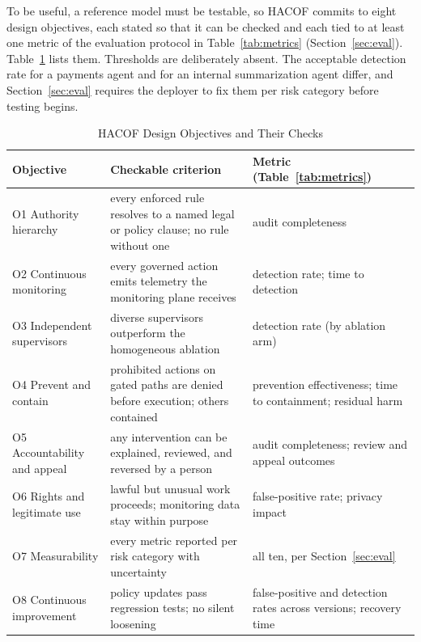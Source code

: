 \documentclass{ieeeaccess}
\newcommand{\hacof}{HACOF}
\begin{document}
To be useful, a reference model must be testable, so \hacof{} commits to eight design objectives, each stated so that it can be checked and each tied to at least one metric of the evaluation protocol in Table~\ref{tab:metrics} (Section~\ref{sec:eval}). Table~\ref{tab:objectives} lists them. Thresholds are deliberately absent. The acceptable detection rate for a payments agent and for an internal summarization agent differ, and Section~\ref{sec:eval} requires the deployer to fix them per risk category before testing begins.

\begin{table}[!t]
\caption{\hacof{} Design Objectives and Their Checks}
\label{tab:objectives}
\centering
\footnotesize
\setlength{\tabcolsep}{3pt}
\begin{tabular}{>{\raggedright\arraybackslash}p{1.75cm}>{\raggedright\arraybackslash}p{3.15cm}>{\raggedright\arraybackslash}p{2.25cm}}
\toprule
\rowcolor{darkblue!15}
\textbf{Objective} & \textbf{Checkable criterion} & \textbf{Metric (Table~\ref{tab:metrics})} \\
\midrule
O1 Authority hierarchy & every enforced rule resolves to a named legal or policy clause; no rule without one & audit completeness \\
\rowcolor{darkblue!5}
O2 Continuous monitoring & every governed action emits telemetry the monitoring plane receives & detection rate; time to detection \\
O3 Independent supervisors & diverse supervisors outperform the homogeneous ablation & detection rate (by ablation arm) \\
\rowcolor{darkblue!5}
O4 Prevent and contain & prohibited actions on gated paths are denied before execution; others contained & prevention effectiveness; time to containment; residual harm \\
O5 Accountability and appeal & any intervention can be explained, reviewed, and reversed by a person & audit completeness; review and appeal outcomes \\
\rowcolor{darkblue!5}
O6 Rights and legitimate use & lawful but unusual work proceeds; monitoring data stay within purpose & false-positive rate; privacy impact \\
O7 Measurability & every metric reported per risk category with uncertainty & all ten, per Section~\ref{sec:eval} \\
\rowcolor{darkblue!5}
O8 Continuous improvement & policy updates pass regression tests; no silent loosening & false-positive and detection rates across versions; recovery time \\
\bottomrule
\end{tabular}
\end{table}
\end{document}
